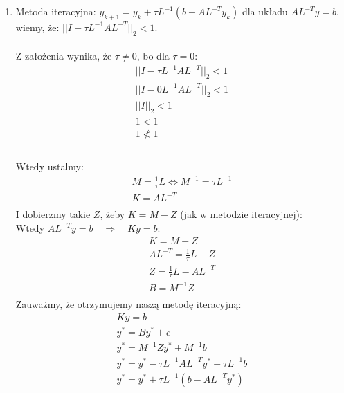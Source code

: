 \documentclass[a4paper]{article}
\begin{document}
      \begin{enumerate}[label=(\alph*)]
         \item
            Metoda iteracyjna: $y_{k+1} = y_{k} + \tau L^{-1} (b - A L^{-T} y_{k})$ dla układu $A L^{-T} y = b$, \\
            wiemy, że: $||I - \tau L^{-1} A L^{-T}||_{2} < 1$. \\
            \\
            Z założenia wynika, że $\tau \ne 0$, bo dla $\tau = 0$:
            \begin{gather*}
               ||I - \tau L^{-1} A L^{-T} ||_{2} < 1 \\
               ||I - 0 L^{-1} A L^{-T} ||_{2} < 1 \\
               ||I||_{2} < 1 \\
               1 < 1 \\
               1 \not < 1 \\
            \end{gather*}
            \\
            Wtedy ustalmy:
            \begin{gather*}
               M = \frac{1}{\tau} L \Longleftrightarrow M^{-1} = \tau L^{-1} \\
               K = A L^{-T} \\
            \end{gather*}
            I dobierzmy takie $Z$, żeby $K = M - Z$ (jak w metodzie iteracyjnej): \\
            Wtedy $A L^{-T} y = b \quad \Longrightarrow \quad K y = b$:
            \begin{gather*}
               K = M - Z \\
               A L^{-T} = \frac{1}{\tau} L - Z \\
               Z = \frac{1}{\tau} L - A L^{-T} \\
               B = M^{-1} Z \\
            \end{gather*}
            Zauważmy, że otrzymujemy naszą metodę iteracyjną:
            \begin{gather*}
               K y = b \\
               y^{*} = B y^{*} + c \\
               y^{*} = M^{-1} Z y^{*} + M^{-1} b \\
               y^{*} = y^{*} - \tau L^{-1} A L^{-T} y^{*} + \tau L^{-1} b \\
               y^{*} = y^{*} + \tau L^{-1} (b - AL^{-T} y^{*}) \\

\end{gather*}
\end{enumerate}
\end{document}
